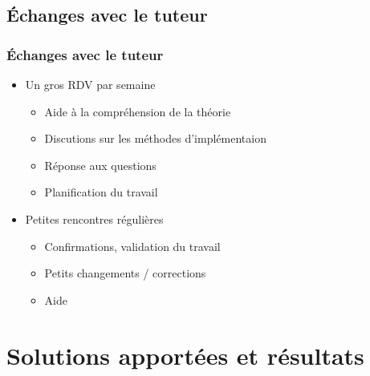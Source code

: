 \documentclass{beamer}
\theoremstyle{remark}
\theoremstyle{plain}
\begin{document}
\subsection{Échanges avec le tuteur}
\begin{frame}
  \frametitle{Échanges avec le tuteur}
  \begin{itemize}
        \item{Un gros RDV par semaine}
        \begin{itemize}%
            [triangle]
            \item{Aide à la compréhension de la théorie}
            \item{Discutions sur les méthodes d'implémentaion}
            \item{Réponse aux questions}
            \item{Planification du travail}
        \end{itemize}
        \vspace{0.5cm}
        \item{Petites rencontres régulières}
        \begin{itemize}%
            [triangle]
            \item{Confirmations, validation du travail}
            \item{Petits changements / corrections}
            \item{Aide}
        \end{itemize}
  \end{itemize}
\end{frame}


\section{Solutions apportées et résultats}
\label{sec:partie4}
\end{document}
